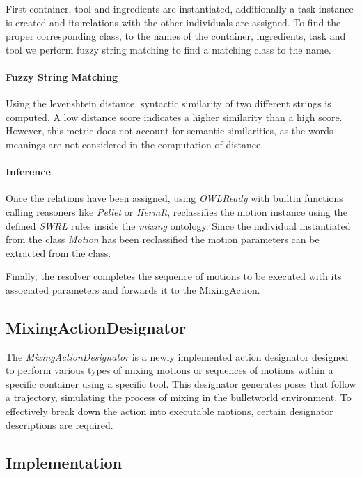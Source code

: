 First container, tool and ingredients are instantiated, additionally a task instance is created and its relations with 
the other individuals are assigned. To find the proper corresponding class, to the names of the container, ingredients, task and tool
we perform fuzzy string matching to find a matching class to the name. 

\paragraph{Fuzzy String Matching}
Using the levenshtein distance, syntactic similarity of two different strings is computed. A low distance score
indicates a higher similarity than a high score. However, this metric does not account for semantic similarities, 
as the words meanings are not considered in the computation of distance.

\paragraph{Inference}
Once the relations have been assigned, using \textit{OWLReady} with builtin functions calling reasoners like \textit{Pellet} or \textit{HermIt},
reclassifies the motion instance using the defined \textit{SWRL} rules inside the \textit{mixing} ontology.
Since the individual instantiated from the class \textit{Motion} has been reclassified the motion parameters can be extracted from the class.

Finally, the resolver completes the sequence of motions to be executed with its associated parameters and 
forwards it to the MixingAction.

\subsection{MixingActionDesignator}
The \textit{MixingActionDesignator} is a newly implemented action designator 
designed to perform various types of mixing motions or sequences of motions within a specific container using a specific tool. 
This designator generates poses that follow a trajectory, simulating the process of mixing in the bulletworld environment.
To effectively break down the action into executable motions, certain designator descriptions are required.

\subsection{Implementation}

